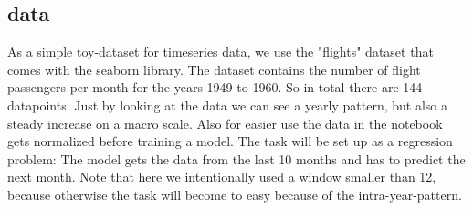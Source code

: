 \documentclass{article}
\begin{document}
\subsection{data}
As a simple toy-dataset for timeseries data, we use the "flights" dataset that comes with the seaborn library. The dataset contains the number of flight passengers per month for the years 1949 to 1960. So in total there are 144 datapoints. Just by looking at the data we can see a yearly pattern, but also a steady increase on a macro scale. Also for easier use the data in the notebook gets normalized before training a model. The task will be set up as a regression problem: The model gets the data from the last 10 months and has to predict the next month. Note that here we intentionally used a window smaller than 12, because otherwise the task will become to easy because of the intra-year-pattern.
\end{document}
